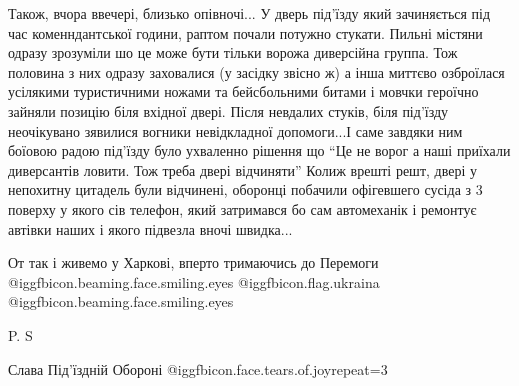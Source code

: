 Також, вчора ввечері, близько опівночі... У дверь  під'їзду який зачиняється
під час коменндантської години, раптом почали потужно стукати. Пильні містяни
одразу зрозуміли шо це може бути тільки ворожа диверсійна группа. Тож половина
з них одразу заховалися (у засідку звісно ж) а інша миттєво озброїлася
усілякими туристичними ножами та бейсбольними битами і мовчки героїчно зайняли
позицію біля вхідної двері. Після невдалих стуків, біля під'їзду неочікувано
зявилися вогники невідкладної допомоги...І саме завдяки ним боїовою радою
під'їзду було ухваленно рішення що \enquote{Це не ворог а наші приїхали
диверсантів ловити. Тож треба двері відчиняти} Колиж врешті решт, двері у
непохитну цитадель були відчинені, оборонці побачили офігевшего сусіда з 3
поверху у якого сів телефон, який затримався бо сам автомеханік і ремонтує
автівки наших і якого підвезла вночі швидка...

От так і живемо у Харкові, вперто тримаючись до Перемоги
 @igg{fbicon.beaming.face.smiling.eyes} @igg{fbicon.flag.ukraina} @igg{fbicon.beaming.face.smiling.eyes} 

P. S

Слава Під'їздній Обороні @igg{fbicon.face.tears.of.joy}{repeat=3} 

